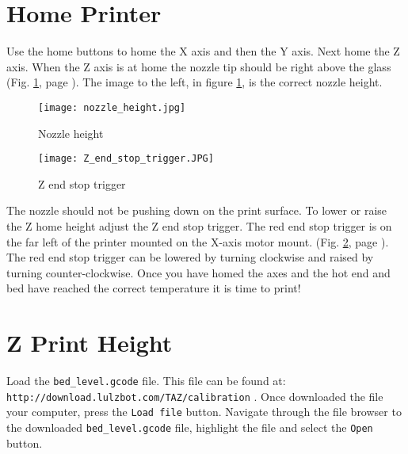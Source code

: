 \section{Home Printer}
Use the home buttons to home the X axis and then the Y axis. Next home the Z axis. When the Z axis is at home the nozzle tip should be right above the glass
(Fig. \ref{fig:nozzle_height}, page \pageref{fig:nozzle_height}). The image to the left, in figure \ref{fig:nozzle_height}, is the correct nozzle height.
\begin{figure}[p]
\centering
\texttt{[image: nozzle\_height.jpg]}
\caption{Nozzle height}
\label{fig:nozzle_height}
\end{figure}
\begin{figure}[p]
\centering
\texttt{[image: Z\_end\_stop\_trigger.JPG]}
\caption{Z end stop trigger}
\label{fig:Z_end_stop_trigger}
\end{figure}
The nozzle should not be pushing down on the print surface. To lower or raise the Z home height adjust the Z end stop trigger. The red end stop trigger is on the far left of the printer mounted on the X-axis motor mount.
(Fig. \ref{fig:Z_end_stop_trigger}, page \pageref{fig:Z_end_stop_trigger}).
The red end stop trigger can be lowered by turning clockwise and raised by turning counter-clockwise. Once you have homed the axes and the hot end and bed have reached the correct temperature it is time to print!

\section{Z Print Height}
Load the \texttt{bed_level.gcode} file.
This file can be found at: \texttt{http://download.lulzbot.com/TAZ/calibration} . Once downloaded the file your computer, press the \texttt{Load file} button. Navigate through the file browser to the downloaded \texttt{bed\_level.gcode} file, highlight the file and select the \texttt{Open} button.


